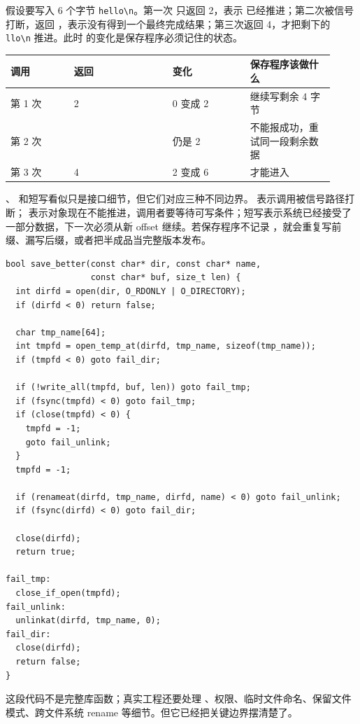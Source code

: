 假设要写入 6 个字节 \verb|hello\n|。第一次  只返回 2，表示  已经推进；第二次被信号打断，返回 ，表示没有得到一个最终完成结果；第三次返回 4，才把剩下的 \verb|llo\n| 推进。此时  的变化是保存程序必须记住的状态。

\begin{longtable}{|L{0.18\linewidth}|L{0.28\linewidth}|L{0.22\linewidth}|L{0.24\linewidth}|}
\toprule
调用 & 返回 &  变化 & 保存程序该做什么 \\
\midrule
第 1 次  & 2 & 0 变成 2 & 继续写剩余 4 字节 \\\tablerowrule
第 2 次  &  & 仍是 2 & 不能报成功，重试同一段剩余数据 \\\tablerowrule
第 3 次  & 4 & 2 变成 6 & 才能进入  \\
\bottomrule
\end{longtable}

、 和短写看似只是接口细节，但它们对应三种不同边界。 表示调用被信号路径打断； 表示对象现在不能推进，调用者要等待可写条件；短写表示系统已经接受了一部分数据，下一次必须从新 offset 继续。若保存程序不记录 ，就会重复写前缀、漏写后缀，或者把半成品当完整版本发布。

\begin{lstlisting}
bool save_better(const char* dir, const char* name,
                 const char* buf, size_t len) {
  int dirfd = open(dir, O_RDONLY | O_DIRECTORY);
  if (dirfd < 0) return false;

  char tmp_name[64];
  int tmpfd = open_temp_at(dirfd, tmp_name, sizeof(tmp_name));
  if (tmpfd < 0) goto fail_dir;

  if (!write_all(tmpfd, buf, len)) goto fail_tmp;
  if (fsync(tmpfd) < 0) goto fail_tmp;
  if (close(tmpfd) < 0) {
    tmpfd = -1;
    goto fail_unlink;
  }
  tmpfd = -1;

  if (renameat(dirfd, tmp_name, dirfd, name) < 0) goto fail_unlink;
  if (fsync(dirfd) < 0) goto fail_dir;

  close(dirfd);
  return true;

fail_tmp:
  close_if_open(tmpfd);
fail_unlink:
  unlinkat(dirfd, tmp_name, 0);
fail_dir:
  close(dirfd);
  return false;
}
\end{lstlisting}

这段代码不是完整库函数；真实工程还要处理 、权限、临时文件命名、保留文件模式、跨文件系统 rename 等细节。但它已经把关键边界摆清楚了。

